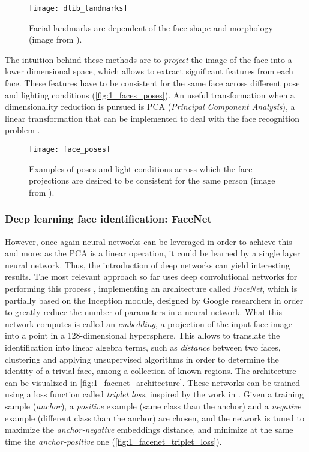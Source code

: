 \begin{figure}[h]
	\centering
	\texttt{[image: dlib\_landmarks]}
	\caption{Facial landmarks are dependent of the face shape and morphology (image from \cite{dlib_review}).}
	\label{fig:1_dlib_landmarks}
\end{figure}


The intuition behind these methods are to \textit{project} the image of the face into a lower dimensional space, which allows to extract significant features from each face. These features have to be consistent for the same face across different pose and lighting conditions (\autoref{fig:1_faces_poses}). An useful transformation when a dimensionality reduction is pursued is PCA (\textit{Principal Component Analysis}), a linear transformation that can be implemented to deal with the face recognition problem \cite{face_pca}.

\begin{figure}[h]
	\centering
	\texttt{[image: face\_poses]}
	\caption{Examples of poses and light conditions across which the face projections are desired to be consistent for the same person (image from \cite{facenet}).}
	\label{fig:1_faces_poses}
\end{figure}

\subsubsection{Deep learning face identification: FaceNet}
\label{sec:1_facenet}
However, once again neural networks can be leveraged in order to achieve this and more: as the PCA is a linear operation, it could be learned by a single layer neural network. Thus, the introduction of deep networks can yield interesting results. The most relevant approach so far uses deep convolutional networks for performing this process \cite{facenet}, implementing an architecture called \textit{FaceNet}, which is partially based on the Inception \cite{inception} module, designed by Google researchers in order to greatly reduce the number of parameters in a neural network. What this network computes is called an \textit{embedding}, a projection of the input face image into a point in a 128-dimensional hypersphere. This allows to translate the identification into linear algebra terms, such as \textit{distance} between two faces, clustering and applying unsupervised algorithms in order to determine the identity of a trivial face, among a collection of known regions. The architecture can be visualized in \autoref{fig:1_facenet_architecture}. These networks can be trained using a loss function called \textit{triplet loss}, inspired by the work in \cite{lmnn_loss}. Given a training sample (\textit{anchor}), a \textit{positive} example (same class than the anchor) and a \textit{negative} example (different class than the anchor) are chosen, and the network is tuned to maximize the \textit{anchor-negative} embeddings distance, and minimize at the same time the \textit{anchor-positive} one (\autoref{fig:1_facenet_triplet_loss}).


